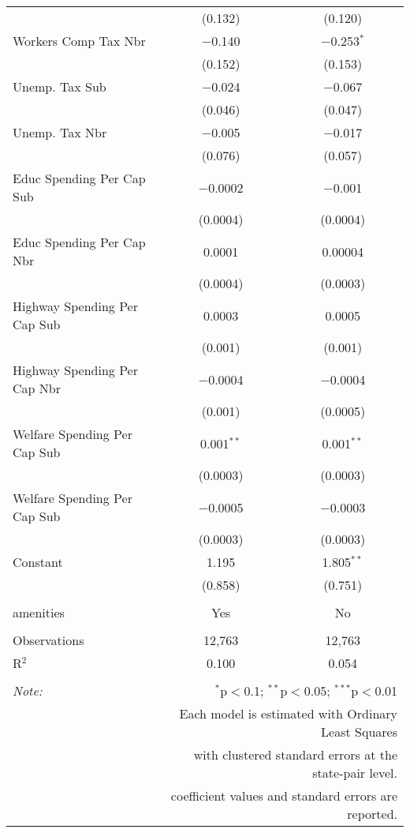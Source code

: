 \begin{table}[!htbp]
\begin{tabular}{@{\extracolsep{5pt}}lcc}
  & (0.132) & (0.120) \\ 
  Workers Comp Tax Nbr & $-$0.140 & $-$0.253$^{*}$ \\ 
  & (0.152) & (0.153) \\ 
  Unemp. Tax Sub & $-$0.024 & $-$0.067 \\ 
  & (0.046) & (0.047) \\ 
  Unemp. Tax Nbr & $-$0.005 & $-$0.017 \\ 
  & (0.076) & (0.057) \\ 
  Educ Spending Per Cap Sub & $-$0.0002 & $-$0.001 \\ 
  & (0.0004) & (0.0004) \\ 
  Educ Spending Per Cap Nbr & 0.0001 & 0.00004 \\ 
  & (0.0004) & (0.0003) \\ 
  Highway Spending Per Cap Sub & 0.0003 & 0.0005 \\ 
  & (0.001) & (0.001) \\ 
  Highway Spending Per Cap Nbr & $-$0.0004 & $-$0.0004 \\ 
  & (0.001) & (0.0005) \\ 
  Welfare Spending Per Cap Sub & 0.001$^{**}$ & 0.001$^{**}$ \\ 
  & (0.0003) & (0.0003) \\ 
  Welfare Spending Per Cap Sub & $-$0.0005 & $-$0.0003 \\ 
  & (0.0003) & (0.0003) \\ 
  Constant & 1.195 & 1.805$^{**}$ \\ 
  & (0.858) & (0.751) \\ 
 \hline \\[-1.8ex] 
amenities & Yes & No \\ 
\hline \\[-1.8ex] 
Observations & 12,763 & 12,763 \\ 
R$^{2}$ & 0.100 & 0.054 \\ 
\hline 
\hline \\[-1.8ex] 
\textit{Note:}  & \multicolumn{2}{r}{$^{*}$p$<$0.1; $^{**}$p$<$0.05; $^{***}$p$<$0.01} \\ 
 & \multicolumn{2}{r}{Each model is estimated with Ordinary Least Squares} \\ 
 & \multicolumn{2}{r}{with clustered standard errors at the state-pair level.} \\ 
 & \multicolumn{2}{r}{coefficient values and standard errors are reported.} \\ 
\end{tabular} 
\end{table} 
